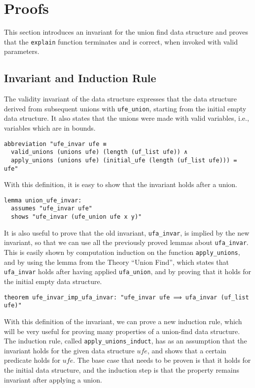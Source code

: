 \section{Proofs}

This section introduces an invariant for the union find data structure and proves that the \lstinline{explain} function terminates and is correct, when invoked with valid parameters.

\subsection{Invariant and Induction Rule}

The validity invariant of the data structure expresses that the data structure derived from subsequent unions with \lstinline{ufe_union}, starting from the initial empty data structure.
It also states that the unions were made with valid variables, i.e., variables which are in bounds.

\begin{lstlisting}
abbreviation "ufe_invar ufe ≡
  valid_unions (unions ufe) (length (uf_list ufe)) ∧
  apply_unions (unions ufe) (initial_ufe (length (uf_list ufe))) = ufe"
\end{lstlisting}

With this definition, it is easy to show that the invariant holds after a union.

\begin{lstlisting}
lemma union_ufe_invar:
  assumes "ufe_invar ufe"
  shows "ufe_invar (ufe_union ufe x y)"
\end{lstlisting}

It is also useful to prove that the old invariant, \lstinline{ufa_invar}, is implied by the new invariant, so that we can use all the previously proved lemmas about \lstinline{ufa_invar}. This is easily shown by computation induction on the function \lstinline{apply_unions}, and by using the lemma from the Theory ``Union Find'', which states that \lstinline{ufa_invar} holds after having applied \lstinline{ufa_union}, and by proving that it holds for the initial empty data structure.

\begin{lstlisting}
theorem ufe_invar_imp_ufa_invar: "ufe_invar ufe ⟹ ufa_invar (uf_list ufe)"
\end{lstlisting}

With this definition of the invariant, we can prove a new induction rule, which will be very useful for proving many properties of a union-find data structure. The induction rule, called \lstinline{apply_unions_induct}, has as an assumption that the invariant holds for the given data structure $ufe$, and shows that a certain predicate holds for $ufe$. The base case that needs to be proven is that it holds for the initial data structure, and the induction step is that the property remains invariant after applying a union.

